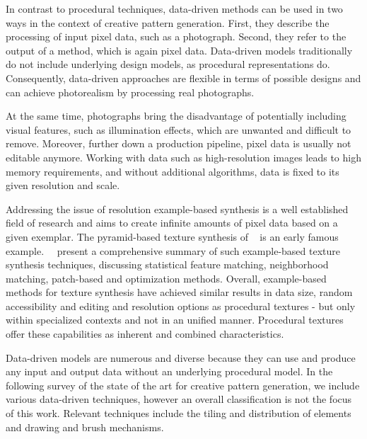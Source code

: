 In contrast to procedural techniques, data-driven methods can be used in two ways in the context of creative pattern generation. First, they describe the processing of input pixel data, such as a photograph. Second, they refer to the output of a method, which is again pixel data. Data-driven models traditionally do not include underlying design models, as procedural representations do. Consequently, data-driven approaches are flexible in terms of possible designs and can achieve photorealism by processing real photographs.

At the same time, photographs bring the disadvantage of potentially including visual features, such as illumination effects, which are unwanted and difficult to remove. Moreover, further down a production pipeline, pixel data is usually not editable anymore. Working with data such as high-resolution images leads to high memory requirements, and without additional algorithms, data is fixed to its given resolution and scale.

Addressing the issue of resolution example-based synthesis is a well established field of research and aims to create infinite amounts of pixel data based on a given exemplar. The pyramid-based texture synthesis of \citeauthor*{heeger_1995_pbt}~\cite{heeger_1995_pbt} is an early famous example.~\citeauthor*{wei_2009_seb}~\cite{wei_2009_seb} present a comprehensive summary of such example-based texture synthesis techniques, discussing statistical feature matching, neighborhood matching, patch-based and optimization methods. Overall, example-based methods for texture synthesis have achieved similar results in data size, random accessibility and editing and resolution options as procedural textures - but only within specialized contexts and not in an unified manner. Procedural textures offer these capabilities as inherent and combined characteristics.

Data-driven models are numerous and diverse because they can use and produce any input and output data without an underlying procedural model. In the following survey of the state of the art for creative pattern generation, we include various data-driven techniques, however an overall classification is not the focus of this work. Relevant techniques include the tiling and distribution of elements and drawing and brush mechanisms.



